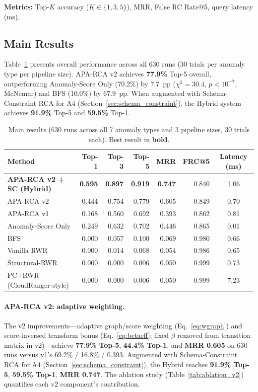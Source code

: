 \documentclass{article}
\newcommand{\aparca}{\textsc{APA-RCA}}
\begin{document}
\textbf{Metrics:}
Top-$K$ accuracy ($K \in \{1,3,5\}$), MRR, False RC Rate@5, query
latency (ms).

\subsection{Main Results}

Table~\ref{tab:main} presents overall performance across all 630 runs (30 trials per anomaly type per pipeline size).
\aparca{} v2 achieves \textbf{77.9\%} Top-5 overall, outperforming Anomaly-Score Only
(70.2\%) by 7.7~pp ($\chi^2=30.4$, $p<10^{-7}$, McNemar) and BFS (10.0\%) by 67.9~pp.
When augmented with Schema-Constraint RCA for A4 (Section~\ref{sec:schema_constraint}),
the Hybrid system achieves \textbf{91.9\%} Top-5 and \textbf{59.5\%} Top-1.

\begin{table}[h]
  \centering
  \caption{Main results (630 runs across all 7 anomaly types and 3 pipeline sizes, 30 trials each).
           Best result in \textbf{bold}.}
  \label{tab:main}
  \small
  \begin{tabular}{lrrrrrc}
    \toprule
    Method & Top-1 & Top-3 & Top-5 & MRR & FRC@5 & Latency (ms) \\
    \midrule
    \textbf{\aparca{} v2 + SC (Hybrid)} & \textbf{0.595} & \textbf{0.897} & \textbf{0.919} & \textbf{0.747} & 0.840 & 1.06 \\
    \aparca{} v2                         & 0.444 & 0.754 & 0.779 & 0.605 & 0.849 & 0.70 \\
    \aparca{} v1                         & 0.168 & 0.560 & 0.692 & 0.393 & 0.862 & 0.81 \\
    Anomaly-Score Only                   & 0.249 & 0.632 & 0.702 & 0.446 & 0.865 & 0.01 \\
    BFS                                  & 0.000 & 0.057 & 0.100 & 0.069 & 0.980 & 0.66 \\
    Vanilla RWR                          & 0.000 & 0.014 & 0.068 & 0.054 & 0.986 & 0.65 \\
    Structural-RWR                       & 0.000 & 0.000 & 0.006 & 0.050 & 0.999 & 0.73 \\
    PC+RWR (CloudRanger-style)           & 0.000 & 0.000 & 0.006 & 0.050 & 0.999 & 7.23 \\
    \bottomrule
  \end{tabular}
\end{table}

\paragraph{APA-RCA v2: adaptive weighting.}
The v2 improvements---adaptive graph/score weighting (Eq.~\ref{eq:wgraph})
and score-inversed transform bonus (Eq.~\ref{eq:betaeff}; fixed $\beta$ removed
from transition matrix in v2)---achieve \textbf{77.9\% Top-5},
\textbf{44.4\% Top-1}, and \textbf{MRR 0.605} on 630 runs versus v1's 69.2\% / 16.8\% / 0.393.
Augmented with Schema-Constraint RCA for A4 (Section~\ref{sec:schema_constraint}),
the Hybrid reaches \textbf{91.9\% Top-5}, \textbf{59.5\% Top-1}, \textbf{MRR 0.747}.
The ablation study (Table~\ref{tab:ablation_v2}) quantifies each v2 component's contribution.
\end{document}
